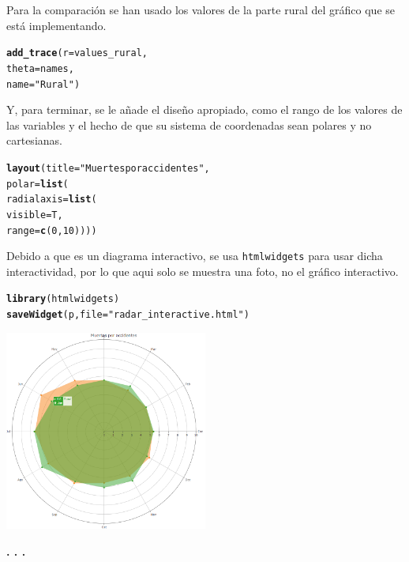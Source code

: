 \documentclass{article}\usepackage[]{graphicx}\usepackage[]{color}
\makeatletter
\newcommand{\hlnum}[1]{\textcolor[rgb]{0.686,0.059,0.569}{#1}}%
\newcommand{\hlstr}[1]{\textcolor[rgb]{0.192,0.494,0.8}{#1}}%
\newcommand{\hlstd}[1]{\textcolor[rgb]{0.345,0.345,0.345}{#1}}%
\newcommand{\hlkwc}[1]{\textcolor[rgb]{0.333,0.667,0.333}{#1}}%
\newcommand{\hlkwd}[1]{\textcolor[rgb]{0.737,0.353,0.396}{\textbf{#1}}}%
\newenvironment{kframe}{%
 \def\at@end@of@kframe{}%
 \ifinner\ifhmode%
  \def\at@end@of@kframe{\end{minipage}}%
  \begin{minipage}{\columnwidth}%
 \fi\fi%
 \def\FrameCommand##1{\hskip\@totalleftmargin \hskip-\fboxsep
 \colorbox{shadecolor}{##1}\hskip-\fboxsep
     \hskip-\linewidth \hskip-\@totalleftmargin \hskip\columnwidth}%
 \MakeFramed {\advance\hsize-\width
   \@totalleftmargin\z@ \linewidth\hsize
   \@setminipage}}%
 {\par\unskip\endMakeFramed%
 \at@end@of@kframe}
\newenvironment{knitrout}{}{} %
\makeatother
\begin{document}
Para la comparaci\'on se han usado los valores de la parte rural del gr\'afico que se est\'a implementando.
\begin{knitrout}
\color{fgcolor}\begin{kframe}
\begin{alltt}
  \hlkwd{add_trace}(r = values_rural,
           theta = names,
           name = \hlstr{"Rural"}) %
\end{alltt}
\end{kframe}
\end{knitrout}
Y, para terminar, se le a\~nade el dise\~no apropiado, como el rango de los valores de las variables y el hecho de que su sistema de coordenadas sean polares y no cartesianas.
\begin{knitrout}
\color{fgcolor}\begin{kframe}
\begin{alltt}
  \hlkwd{layout}\hlstd{(} \hlkwc{title}\hlstd{=} \hlstr{"Muertes por accidentes"}\hlstd{,}
    \hlkwc{polar} \hlstd{=} \hlkwd{list}\hlstd{(}
    \hlkwc{radialaxis} \hlstd{=} \hlkwd{list}\hlstd{(}
      \hlkwc{visible} \hlstd{= T,}
      \hlkwc{range} \hlstd{=} \hlkwd{c}\hlstd{(}\hlnum{0}\hlstd{,} \hlnum{10}\hlstd{))))}
\end{alltt}
\end{kframe}
\end{knitrout}

Debido a que es un diagrama interactivo, se usa \texttt{htmlwidgets} %
para usar dicha interactividad, por lo que aqui solo se muestra una foto, no el gr\'afico interactivo.
\begin{knitrout}
\color{fgcolor}\begin{kframe}
\begin{alltt}
\hlkwd{library}\hlstd{(htmlwidgets)}
\hlkwd{saveWidget}\hlstd{(p,} \hlkwc{file}\hlstd{=}\hlstr{"radar_interactive.html"}\hlstd{)}
\end{alltt}
\end{kframe}
\end{knitrout}
\vbox{
    \centering
    \includegraphics[width=0.5\textwidth]{imag/radar_interactive}
}
\begin{center}
\textbf{. . .}
\end{center}
\end{document}
